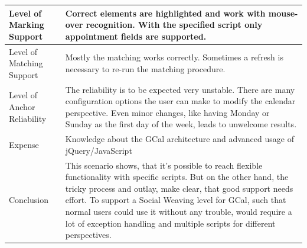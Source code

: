 \begin{tabular}{|p{}| p{} |}
\hline 
Level of Marking Support & Correct elements are highlighted and work with mouse-over recognition. With the specified script only appointment fields are supported.\\ 
\hline 
Level of Matching Support & Mostly the matching works correctly. Sometimes a refresh is necessary to re-run the matching procedure. \\ 
\hline 
Level of Anchor Reliability & The reliability is to be expected very unstable. There are many configuration options the user can make to modify the calendar perspective. Even minor changes, like having Monday or Sunday as the first day of the week, leads to unwelcome results. \\ 
\hline 
Expense & Knowledge about the GCal architecture and advanced usage of jQuery/JavaScript \\ 
\hline 
Conclusion & This scenario shows, that it's possible to reach flexible functionality with specific scripts. But on the other hand, the tricky process and outlay, make clear, that good support needs effort. To support a Social Weaving level for GCal, such that normal users could use it without any trouble, would require a lot of exception handling and multiple scripts for different perspectives. \\ 
\hline 
\end{tabular} 


